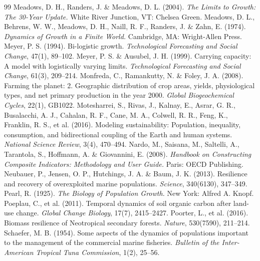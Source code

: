 \documentclass[11pt,a4paper]{article}
\begin{document}
\begin{thebibliography}{99}
 Meadows, D. H., Randers, J. \& Meadows, D. L. (2004). \emph{The Limits to Growth: The 30-Year Update.} White River Junction, VT: Chelsea Green.
 Meadows, D. L., Behrens, W. W., Meadows, D. H., Naill, R. F., Randers, J. \& Zahn, E. (1974). \emph{Dynamics of Growth in a Finite World.} Cambridge, MA: Wright-Allen Press.
 Meyer, P. S. (1994). Bi-logistic growth. \emph{Technological Forecasting and Social Change}, 47(1), 89--102.
 Meyer, P. S. \& Ausubel, J. H. (1999). Carrying capacity: A model with logistically varying limits. \emph{Technological Forecasting and Social Change}, 61(3), 209--214.
 Monfreda, C., Ramankutty, N. \& Foley, J. A. (2008). Farming the planet: 2. Geographic distribution of crop areas, yields, physiological types, and net primary production in the year 2000. \emph{Global Biogeochemical Cycles}, 22(1), GB1022.
 Motesharrei, S., Rivas, J., Kalnay, E., Asrar, G. R., Busalacchi, A. J., Cahalan, R. F., Cane, M. A., Colwell, R. R., Feng, K., Franklin, R. S., et al. (2016). Modeling sustainability: Population, inequality, consumption, and bidirectional coupling of the Earth and human systems. \emph{National Science Review}, 3(4), 470--494.
 Nardo, M., Saisana, M., Saltelli, A., Tarantola, S., Hoffmann, A. \& Giovannini, E. (2008). \emph{Handbook on Constructing Composite Indicators: Methodology and User Guide.} Paris: OECD Publishing.
 Neubauer, P., Jensen, O. P., Hutchings, J. A. \& Baum, J. K. (2013). Resilience and recovery of overexploited marine populations. \emph{Science}, 340(6130), 347--349.
 Pearl, R. (1925). \emph{The Biology of Population Growth.} New York: Alfred A. Knopf.
 Poeplau, C., et al. (2011). Temporal dynamics of soil organic carbon after land-use change. \emph{Global Change Biology}, 17(7), 2415--2427.
 Poorter, L., et al. (2016). Biomass resilience of Neotropical secondary forests. \emph{Nature}, 530(7590), 211--214.
 Schaefer, M. B. (1954). Some aspects of the dynamics of populations important to the management of the commercial marine fisheries. \emph{Bulletin of the Inter-American Tropical Tuna Commission}, 1(2), 25--56.

\end{thebibliography}
\end{document}
